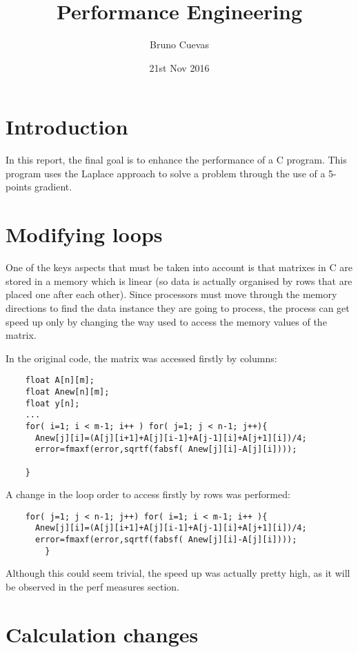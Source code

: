 \documentclass{article}
\title{Performance Engineering}
\author{Bruno Cuevas}
\date{21st Nov 2016}
\begin{document}
	\maketitle
\section {Introduction}

	In this report, the final goal is to enhance the performance of a
	C program. This program uses the Laplace approach to solve a problem
	through the use of a 5-points gradient.

\section {Modifying loops}
	
	One of the keys aspects that must be taken into account is
	that matrixes in C are stored in a memory which is linear (so
	data is actually organised by rows that are placed one
	after each other). Since processors must move through the memory
	directions to find the data instance they are going to process,
	the process can get speed up only by changing the way used to
	access the memory values of the matrix.

	In the original code, the matrix was accessed firstly by columns:

	\begin{verbatim}
	float A[n][m];
	float Anew[n][m];
	float y[n];
	...
	for( i=1; i < m-1; i++ ) for( j=1; j < n-1; j++){
	  Anew[j][i]=(A[j][i+1]+A[j][i-1]+A[j-1][i]+A[j+1][i])/4;
	  error=fmaxf(error,sqrtf(fabsf( Anew[j][i]-A[j][i])));
	
	}
	\end{verbatim}

	A change in the loop order to access firstly by rows was performed:

	\begin{verbatim}
	for( j=1; j < n-1; j++) for( i=1; i < m-1; i++ ){
	  Anew[j][i]=(A[j][i+1]+A[j][i-1]+A[j-1][i]+A[j+1][i])/4;
	  error=fmaxf(error,sqrtf(fabsf( Anew[j][i]-A[j][i])));	
        }
	\end{verbatim}
	
	Although this could seem trivial, the speed up was actually pretty
	high, as it will be observed in the perf measures section.

		
\section {Calculation changes}
\end{document}
